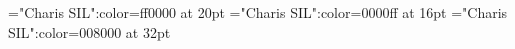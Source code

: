 \documentclass[a4paper]{article}
\begin{document}
\pagestyle{plain}
\sloppy
\setlength{\parfillskip}{0pt plus 1fil}
\font\ta="Charis SIL":color=ff0000 at 20pt
\font\tbta="Charis SIL":color=0000ff at 16pt
\font\tctbta="Charis SIL":color=008000 at 32pt

\mbox{} 
\newpage 
\newpage 
\setcounter{page}{1} 
\pagestyle{fancy} 





\end{document}

